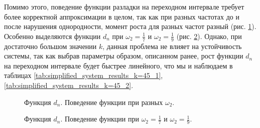 \documentclass[specialist, substylefile = spbu.rtx,
			   subf, href, 12pt]{disser}
\begin{document}
Помимо этого, поведение функции разладки на переходном интервале требует более корректной аппроксимации в целом, так как при разных частотах до и после нарушения однородности, момент роста для разных частот разный (рис. \ref{pic:diff_moment_growth}). Особенно выделяются функции $ d_n $ при $ \omega_2 = \frac{1}{7} $ и $ \omega_2 = \frac{1}{9} $ (рис. \ref{pic:diff_moment_growth_most_unique}). Однако, при достаточно большом значении $ k $, данная проблема не влияет на устойчивость системы, так как выбрав параметры образом, описанном ранее, рост функции $ d_n $ на переходном интервале будет быстрее линейного, что мы и наблюдаем в таблицах \ref{tab:simplified_system_results_k=45_1}, \ref{tab:simplified_system_results_k=45_2}.

\begin{figure}[!hhh]
	\caption{Функция $ d_n $. Поведение функции при разных $ \omega_2 $.}
	\label{pic:diff_moment_growth}
\end{figure}

\begin{figure}[!hhh]
	\caption{Функция $ d_n $. Поведение функции при $ \omega_2 = \frac{1}{7} $ и $ \omega_2 = \frac{1}{9} $.}
	\label{pic:diff_moment_growth_most_unique}
\end{figure}
\end{document}
